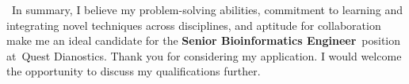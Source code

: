\documentclass[11pt, a4paper]{awesome-cv}
\newcommand{\companyname}{Quest Dianostics}
\newcommand{\role}{Senior Bioinformatics Engineer}
\newcommand{\brole}{\textbf{\role}}
\begin{document}
\begin{cvletter}
		~In summary, I believe my problem-solving abilities, commitment to learning and integrating novel techniques across disciplines, and aptitude for collaboration make me an ideal candidate for the \brole~position at~\companyname.
%
		Thank you for considering my application. I would welcome the opportunity to discuss my qualifications further.
	\end{cvletter}

	\makeletterclosing
\end{document}
